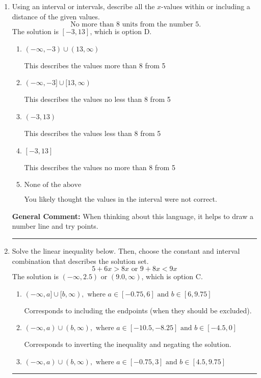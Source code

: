 \documentclass{extbook}[14pt]
\newcommand{\litem}[1]{\item #1

\rule{\textwidth}{0.4pt}}
\begin{document}
\begin{enumerate}
{\begin{enumerate}[label=\Alph*.]
You may have chosen this if you thought the inequality did not match the ends of the intervals.
\end{enumerate}

\textbf{General Comment:} Remember that less/greater than or equal to includes the endpoint, while less/greater do not. Also, remember that you need to flip the inequality when you multiply or divide by a negative.
}
\litem{
Using an interval or intervals, describe all the $x$-values within or including a distance of the given values.
\[ \text{ No more than } 8 \text{ units from the number } 5. \]The solution is \( [-3, 13] \), which is option D.\begin{enumerate}[label=\Alph*.]
\item \( (-\infty, -3) \cup (13, \infty) \)

This describes the values more than 8 from 5
\item \( (-\infty, -3] \cup [13, \infty) \)

This describes the values no less than 8 from 5
\item \( (-3, 13) \)

This describes the values less than 8 from 5
\item \( [-3, 13] \)

This describes the values no more than 8 from 5
\item \( \text{None of the above} \)

You likely thought the values in the interval were not correct.
\end{enumerate}

\textbf{General Comment:} When thinking about this language, it helps to draw a number line and try points.
}
\litem{
Solve the linear inequality below. Then, choose the constant and interval combination that describes the solution set.
\[ 5 + 6 x > 8 x \text{ or } 9 + 8 x < 9 x \]The solution is \( (-\infty, 2.5) \text{ or } (9.0, \infty) \), which is option C.\begin{enumerate}[label=\Alph*.]
\item \( (-\infty, a] \cup [b, \infty), \text{ where } a \in [-0.75, 6] \text{ and } b \in [6, 9.75] \)

Corresponds to including the endpoints (when they should be excluded).
\item \( (-\infty, a) \cup (b, \infty), \text{ where } a \in [-10.5, -8.25] \text{ and } b \in [-4.5, 0] \)

Corresponds to inverting the inequality and negating the solution.
\item \( (-\infty, a) \cup (b, \infty), \text{ where } a \in [-0.75, 3] \text{ and } b \in [4.5, 9.75] \)


\end{enumerate}}
\end{enumerate}
\end{document}
